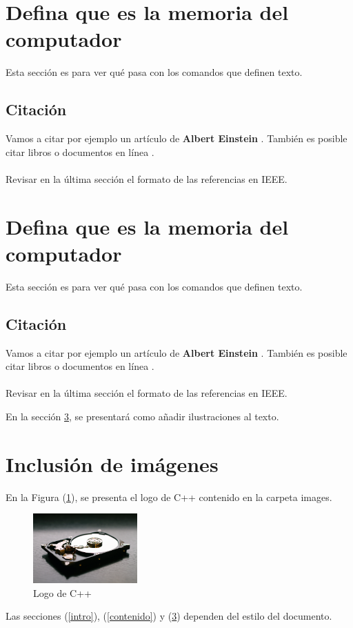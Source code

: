 \documentclass{article}
\begin{document}
	\section{Defina que es la memoria del computador} \label{defina}
	Esta sección es para ver qué pasa con los comandos que definen texto.
	\subsection{Citación}
	Vamos a citar por ejemplo un artículo de \textbf{Albert Einstein} \cite{einstein}.
	También es posible citar libros \cite{dirac} o documentos en línea \cite{knuthwebsite}.\\\\
	Revisar en la última sección el formato de las referencias en IEEE.
	
	\section{Defina que es la memoria del computador} \label{defina}
	Esta sección es para ver qué pasa con los comandos que definen texto.
	\subsection{Citación}
	Vamos a citar por ejemplo un artículo de \textbf{Albert Einstein} \cite{einstein}.
	También es posible citar libros \cite{dirac} o documentos en línea \cite{knuthwebsite}.\\\\
	Revisar en la última sección el formato de las referencias en IEEE.
	
	
	En la sección \ref{imagenes}, se presentará como añadir ilustraciones al texto.
	
	\section{Inclusión de imágenes} \label{imagenes}
	
	En la Figura (\ref{fig:cpplogo}), se presenta el logo de C++ contenido en la carpeta images.
	
	\begin{figure}[h]
		\includegraphics[width=4cm]{rom.jpg}
		\centering
		\caption{Logo de C++}
		\label{fig:cpplogo}
	\end{figure}
	
	Las secciones (\ref{intro}), (\ref{contenido}) y (\ref{imagenes}) dependen del estilo del documento.
	
\end{document}

